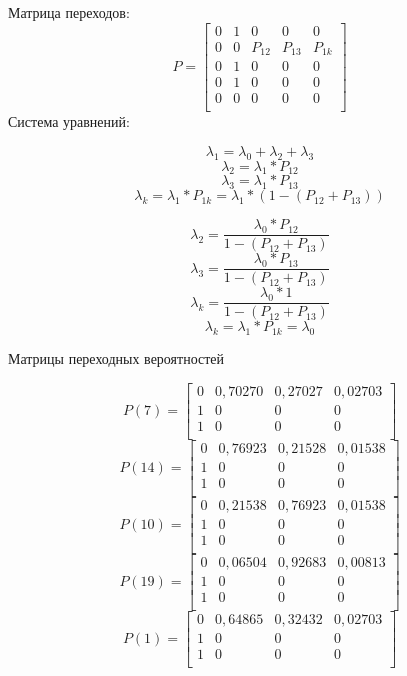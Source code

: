 Матрица переходов: 
\[
P = \begin{bmatrix}
	0 & 1 & 0 & 0 & 0 \\
	0 & 0 & P_{12} & P_{13} & P_{1k} \\
	0 & 1 & 0 & 0 & 0 \\
	0 & 1 & 0 & 0 & 0 \\
	0 & 0 & 0 & 0 & 0 \\
\end{bmatrix}
\]
Система уравнений:


$$
\lambda_1 = \lambda_0 + \lambda_2 + \lambda_3
$$
$$
\lambda_2 = \lambda_1 * P_{12}
$$
$$
\lambda_3 = \lambda_1 * P_{13}
$$
$$
\lambda_k = \lambda_1 * P_{1k} = \lambda_1 * (1-(P_{12} + P_{13}))
$$

$$
\lambda_2 = \frac{\lambda_0 * P_{12}}{1 - (P_{12} + P_{13})}
$$
$$
\lambda_3 = \frac{\lambda_0 * P_{13}}{1 - (P_{12} + P_{13})}
$$
$$
\lambda_k = \frac{\lambda_0 * 1}{1 - (P_{12} + P_{13})}
$$
$$
\lambda_k = \lambda_1 * P_{1k} = \lambda_0
$$

Матрицы переходных вероятностей

\[
P(7) = 
\begin{bmatrix}
0 & 0,70270 & 0,27027 & 0,02703 \\
1 & 0 & 0 & 0 \\
1 & 0 & 0 & 0 \\
\end{bmatrix}
\]
\[
P(14) = 
\begin{bmatrix}
0 & 0,76923 & 0,21528 & 0,01538 \\
1 & 0 & 0 & 0 \\
1 & 0 & 0 & 0 \\
\end{bmatrix}
\]
\[
P(10) = 
\begin{bmatrix}
0 & 0,21538 & 0,76923 & 0,01538 \\
1 & 0 & 0 & 0 \\
1 & 0 & 0 & 0 \\	
\end{bmatrix}
\]
\[
P(19) = 
\begin{bmatrix}
0 & 0,06504 & 0,92683 & 0,00813 \\
1 & 0 & 0 & 0 \\
1 & 0 & 0 & 0 \\
\end{bmatrix}
\]
\[
P(1) = 
\begin{bmatrix}
0 & 0,64865 & 0,32432 & 0,02703 \\
1 & 0 & 0 & 0 \\
1 & 0 & 0 & 0 \\
\end{bmatrix}
\]


